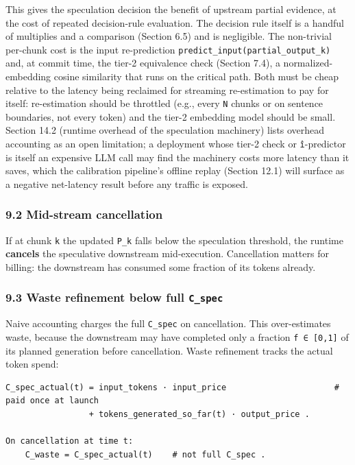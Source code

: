\documentclass[
  11pt,
]{article}
\begin{document}
This gives the speculation decision the benefit of upstream partial
evidence, at the cost of repeated decision-rule evaluation. The decision
rule itself is a handful of multiplies and a comparison (Section 6.5)
and is negligible. The non-trivial per-chunk cost is the input
re-prediction \texttt{predict\_input(partial\_output\_k)} and, at commit
time, the tier-2 equivalence check (Section 7.4), a normalized-embedding
cosine similarity that runs on the critical path. Both must be cheap
relative to the latency being reclaimed for streaming re-estimation to
pay for itself: re-estimation should be throttled (e.g., every
\texttt{N} chunks or on sentence boundaries, not every token) and the
tier-2 embedding model should be small. Section 14.2 (runtime overhead
of the speculation machinery) lists overhead accounting as an open
limitation; a deployment whose tier-2 check or \texttt{î}-predictor is
itself an expensive LLM call may find the machinery costs more latency
than it saves, which the calibration pipeline's offline replay (Section
12.1) will surface as a negative net-latency result before any traffic
is exposed.

\subsubsection{9.2 Mid-stream
cancellation}\label{mid-stream-cancellation}

If at chunk \texttt{k} the updated \texttt{P\_k} falls below the
speculation threshold, the runtime \textbf{cancels} the speculative
downstream mid-execution. Cancellation matters for billing: the
downstream has consumed some fraction of its tokens already.

\subsubsection{\texorpdfstring{9.3 Waste refinement below full
\texttt{C\_spec}}{9.3 Waste refinement below full C\_spec}}\label{waste-refinement-below-full-c_spec}

Naive accounting charges the full \texttt{C\_spec} on cancellation. This
over-estimates waste, because the downstream may have completed only a
fraction \texttt{f\ ∈\ {[}0,1{]}} of its planned generation before
cancellation. Waste refinement tracks the actual token spend:

\begin{verbatim}
C_spec_actual(t) = input_tokens · input_price                      # paid once at launch
                 + tokens_generated_so_far(t) · output_price .

On cancellation at time t:
    C_waste = C_spec_actual(t)    # not full C_spec .
\end{verbatim}
\end{document}
